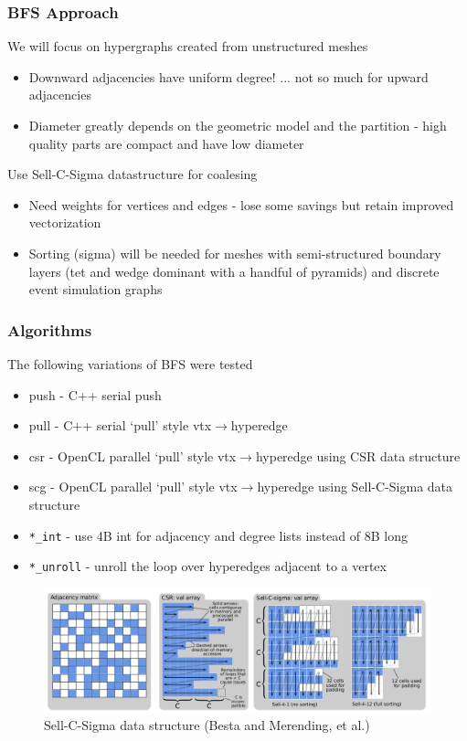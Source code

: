 \documentclass{beamer}
\begin{document}
\begin{frame}
  \frametitle{BFS Approach}
  We will focus on hypergraphs created from unstructured meshes
  \begin{itemize}
    \item Downward adjacencies have uniform degree! ... not so much for upward
      adjacencies
    \item Diameter greatly depends on the geometric model and the
      partition - high quality parts are compact and have low diameter
  \end{itemize}
  Use Sell-C-Sigma datastructure for coalesing 
  \begin{itemize}
    \item Need weights for vertices and edges - lose some savings but retain
      improved vectorization
    \item Sorting (sigma) will be needed for meshes with semi-structured boundary layers (tet
      and wedge dominant with a handful of pyramids) and discrete event simulation graphs
  \end{itemize}
\end{frame}

\begin{frame}
  \frametitle{Algorithms}
  The following variations of BFS were tested
  \begin{itemize}
    \item push - C++ serial push
    \item pull - C++ serial `pull' style vtx$\rightarrow$hyperedge
    \item csr - OpenCL parallel `pull' style vtx$\rightarrow$hyperedge using CSR data
      structure
    \item scg - OpenCL parallel `pull' style vtx$\rightarrow$hyperedge using
      Sell-C-Sigma data structure
    \item \texttt{*\_int} - use 4B int for adjacency and degree lists instead of 8B long
    \item \texttt{*\_unroll} - unroll the loop over hyperedges adjacent to a
      vertex
  \end{itemize}
  \begin{figure}
    \centering
    \includegraphics[width=.6\textwidth]{figures/sellcsigma.png}\\
    \small{Sell-C-Sigma data structure (Besta and Merending, et al.)}
  \end{figure}
\end{frame}
\end{document}
